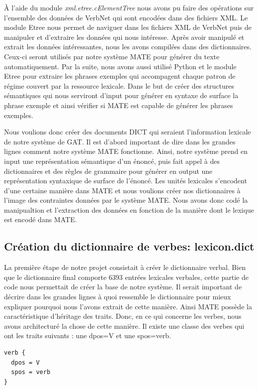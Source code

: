 À l'aide du module \emph{xml.etree.cElementTree} nous avons pu faire des opérations sur l'ensemble des données de VerbNet qui sont encodées dans des fichiers XML. Le module Etree nous permet de naviguer dans les fichiers XML de VerbNet puis de manipuler et d'extraire les données qui nous intéresse. Après avoir manipulé et extrait les données intéressantes, nous les avons compilées dans des dictionnaires. Ceux-ci seront utilisés par notre système MATE pour générer du texte automatiquement. Par la suite, nous avons aussi utilisé Python et le module Etree pour extraire les phrases exemples qui accompagent chaque patron de régime couvert par la ressource lexicale. Dans le but de créer des structures sémantiques qui nous serviront d'input pour générer en syntaxe de surface la phrase exemple et ainsi vérifier si MATE est capable de générer les phrases exemples.

Nous voulions donc créer des documents DICT qui seraient l'information lexicale de notre système de GAT. Il est d'abord important de dire dans les grandes lignes comment notre système MATE fonctionne. Ainsi, notre système prend en input une représentation sémantique d'un énoncé, puis fait appel à des dictionnaires et des règles de grammaire pour générer en output une représentation syntaxique de surface de l'énoncé. Les unités lexicales s'encodent d'une certaine manière dans MATE et nous voulions créer nos dictionnaires à l'image des contraintes données par le système MATE. Nous avons donc codé la manipualtion et l'extraction des données en fonction de la manière dont le lexique est encodé dans MATE.

\subsection{Création du dictionnaire de verbes: lexicon.dict}

La première étape de notre projet consistait à créer le dictionnaire verbal. Bien que le dictionnaire final comporte 6393 entrées lexicales verbales, cette partie de code nous permettait de créer la base de notre système. Il serait important de décrire dans les grandes lignes à quoi ressemble le dictionnaire pour mieux expliquer pourquoi nous l'avons extrait de cette manière. Ainsi MATE possède la caractéristique d'héritage des traits. Donc, en ce qui concerne les verbes, nous avons architecturé la chose de cette manière. Il existe une classe des verbes qui ont les traits suivants : une dpos=V et une spos=verb.

\begin{lstlisting}[language=XML]
verb {
  dpos = V
  spos = verb
}
\end{lstlisting}

